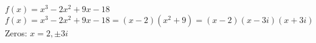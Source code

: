 {$f(x) = x^3-2x^2+9x-18$}
{$f(x) = x^3-2x^2+9x-18 = (x-2) \left(x^2+9\right) = (x-2)(x-3i)(x+3i)$\\
Zeros:  $x=2, \pm 3i$}
